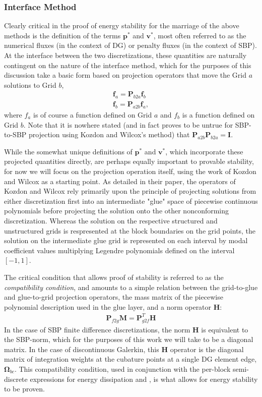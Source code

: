 \subsubsection{Interface Method} \label{sec:interface}

Clearly critical in the proof of energy stability for the marriage of the
above methods is the definition of the terms $\pmb{p}^*$ and $\pmb{v}^*$, most
often referred to as the numerical fluxes (in the context of DG) or penalty fluxes
(in the context of SBP). At the interface between the two discretizations, these
quantities are naturally contingent on the nature of the interface method, which
for the purposes of this discussion take a basic form based on projection operators
that move the Grid $a$ solutions to Grid $b$,
\begin{align}
\pmb{f}_{a} = \pmb{P}_{b2a}\pmb{f}_{b} \\
\pmb{f}_{b} = \pmb{P}_{a2b}\pmb{f}_{a},
\end{align}
where $f_{a}$ is of course a function defined on Grid $a$ and $f_{b}$ is a function
defined on Grid $b$. Note that it is nowhere stated (and in fact proves to be untrue
for SBP-to-SBP projection using Kozdon and Wilcox's method) that $\pmb{P}_{a2b}\pmb{P}_{b2a} = \pmb{I}$.

While the somewhat unique definitions of $\pmb{p}^{*}$ and
$\pmb{v}^{*}$, which incorporate these projected quantities directly, are perhaps
equally important to provable stability, for now we will focus on the projection
operation itself, using the work of Kozdon and Wilcox as a starting point.
As detailed in their paper, the operators of Kozdon and Wilcox rely primarily
upon the principle of projecting solutions from either discretization
first into an intermediate "glue" space of piecewise continuous polynomials
before projecting the solution onto the other nonconforming discretization. Whereas
the solution on the respective structured and unstructured grids is respresented at
the block boundaries on the grid points, the solution on the intermediate glue grid
is represented on each interval by modal coefficient values multiplying Legendre
polynomials defined on the interval $[-1,1]$.

The critical condition that allows proof of stability is referred to as the
\emph{compatibility condition}, and amounts to a simple relation between the
grid-to-glue and glue-to-grid projection operators, the mass matrix of the
piecewise polynomial description used in the glue layer, and a norm operator
$\pmb{H}$:
\begin{align}
\pmb{P}_{f2g}\pmb{M} = \pmb{P}_{g2f}^{T}\pmb{H} \label{eq:compat}
\end{align}
In the case of SBP finite difference discretizations, the norm $\pmb{H}$ is equivalent
to the SBP-norm, which for the purposes of this work we will take to be
a diagonal matrix. In the case of discontinuous Galerkin, this $\pmb{H}$ operator is
the diagonal matrix of integration weights at the cubature points at a single
DG element edge, $\pmb{\Omega}_{bc}$.  This compatibility condition, used in conjunction with
the per-block semi-discrete expressions for energy dissipation  and
, is what allows for energy stability to be proven.

